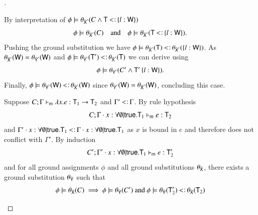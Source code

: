 \documentclass{report}
\begin{document}
\begin{proof}[]
\begin{indcase}{\sdsel}
      By interpretation of $\phi\csat\theta_{\bar{\type{X}}'}(C\land\type{T}\subtype\set{l:\type{W}})$
      \begin{displaymath}
        \phi\csat\theta_{\bar{\type{X}}'}(C)\quad\textrm{and}\quad
        \phi\csat\theta_{\bar{\type{X}}'}(\type{T}\subtype\set{l:\type{W}})\textrm{.}
      \end{displaymath}
      Pushing the ground substitution we have
      $\phi\csat\theta_{\bar{\type{X}}'}(\type{T})\subtype\theta_{\bar{\type{X}}'}(\set{l:\type{W}})$.
      As $\theta_{\bar{\textsf{X}}'}(\textsf{W})=\theta_{\bar{\textsf{Y}}'}(\textsf{W})$ and
      $\phi\csat \theta_{\bar{\type{Y}}'}(\type{T}')\subtype\theta_{\bar{\type{X}}'}(\type{T})$
      we can derive using \cand
      \begin{displaymath}
        \phi\models\theta_{\bar{\textsf{Y}}'}(C'\land\textsf{T}'\left\{l:\textsf{W}\right\})\textrm{.}
      \end{displaymath}
      Finally, $\phi\csat\theta_{\bar{\type{Y}}'}(\type{W})\subtype\theta_{\bar{\type{X}}'}(\type{W})$
      since $\theta_{\bar{\textsf{Y}}'}(\textsf{W})=\theta_{\bar{\textsf{X}}'}(\textsf{W})$,
      concluding this case.
    \end{indcase}
    \begin{indcase}{\decabs}
      Suppose $C;\Gamma\vdash_\textsf{m} \lambda x.e:\textsf{T}_1\rightarrow\textsf{T}_2$
      and $\Gamma'\subtype\Gamma$. By rule hypothesis
      \begin{displaymath}
        C;\Gamma\cdot x:\forall\emptyset|\textsf{true}.\textsf{T}_1\vdash_\textsf{m} e:\textsf{T}_2
      \end{displaymath}
      and $\Gamma'\cdot x:\forall\emptyset|\true.\type{T}_1\subtype\Gamma\cdot x:\forall\emptyset|\true.\type{T}_1$
      as $x$ is bound in $e$ and therefore does not conflict with $\Gamma'$. By induction
      \begin{equation}
        \label{eq:w_sdabs_1}
        C';\Gamma'\cdot x:\forall\emptyset|\textsf{true}.\textsf{T}_1\vdash_\textsf{m} e:\textsf{T}_2'
      \end{equation}
      and for all
      ground assignments $\phi$ and all ground substitutions $\theta_{\bar{\textsf{X}}}$, there
      exists a ground substitution $\theta_{\bar{\textsf{Y}}}$ such that
      \begin{displaymath}
        \phi\csat \theta_{\bar{\type{X}}}(C) \implies \phi\csat \theta_{\bar{\type{Y}}}(C')\textrm{ and }\phi\csat \theta_{\bar{\type{Y}}}(\type{T}_2')\subtype\theta_{\bar{\type{X}}}(\type{T}_2)
      \end{displaymath}

\end{indcase}
\end{proof}
\end{document}
